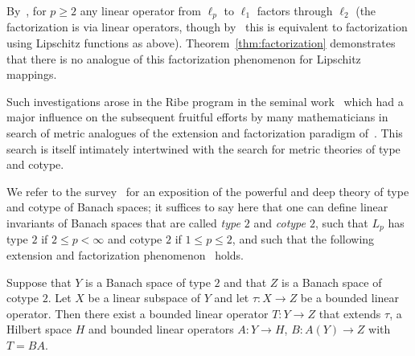 \documentclass[11pt,reqno]{amsart}
\newcommand{\0}{\mathbf{0}}
\renewcommand{\1}{\mathbf 1}
\newcommand{\from}{\colon}
\renewcommand{\ge}{\geqslant}
\renewcommand{\le}{\leqslant}
\theoremstyle{remark}
\begin{document}
By~\cite[Theorem~5.2]{LP68}, for $p\ge 2$ any linear operator from $\ell_p$ to $\ell_1$ factors through $\ell_2$ (the factorization is via linear operators, though by~\cite{JMS09} this is equivalent to factorization using Lipschitz functions as above). Theorem~\ref{thm:factorization} demonstrates that there is no analogue of this factorization phenomenon for Lipschitz mappings.

Such investigations arose in the Ribe program  in the seminal work~\cite{JL84} which had a major influence on the subsequent fruitful efforts by many mathematicians in search of metric analogues of the extension and factorization paradigm of~\cite{Mau74}.  This search is itself intimately intertwined with the search for metric theories of type and cotype.

We refer to the survey~\cite{Mau03} for an exposition of the powerful and deep theory of type and cotype of Banach spaces; it suffices to say here that one can define linear invariants of Banach spaces that are called {\em type $2$} and {\em cotype $2$}, such that  $L_p$ has type $2$ if $2\le p<\infty$ and  cotype $2$ if $1\le p\le 2$, and such that the following extension and factorization phenomenon~\cite{Mau74} holds.

Suppose that $Y$ is a Banach space of type $2$ and that $Z$ is a Banach space of  cotype $2$. Let $X$ be a linear subspace of $Y$ and let $\tau\from X\to Z$ be a bounded linear operator. Then there exist a bounded linear operator $T\from Y\to Z$ that extends $\tau$, a Hilbert space $H$ and bounded linear operators $A\from Y\to H$,  $B\from A(Y)\to Z$ with $T=BA$.
\end{document}
